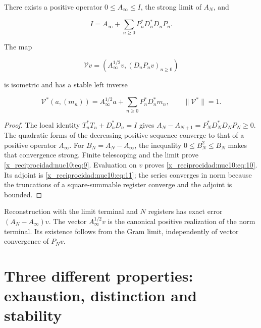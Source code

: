 \begin{theorem}
\label{x_reciprocidad:nuclear:terminal-no-estacionario}
There exists a positive operator \(0\leq A_\infty\leq I\), the strong limit of \(A_N\), and



\begin{equation}
\boxed{I=A_\infty+\sum_{n\ge0}P_n^*D_n^*D_nP_n.}
\label{x_reciprocidad:nuc10:eq:9}
\end{equation}



The map



\begin{equation}
\boxed{\mathcal Vv=(A_\infty^{1/2}v,(D_nP_nv)_{n\ge0})}
\label{x_reciprocidad:nuc10:eq:10}
\end{equation}



is isometric and has a stable left inverse



\begin{equation}
\mathcal V^*(a,(m_n))=A_\infty^{1/2}a+
\sum_{n\ge0}P_n^*D_n^*m_n,\qquad\|\mathcal V^*\|=1.
\label{x_reciprocidad:nuc10:eq:11}
\end{equation}



\end{theorem}
\begin{proof}
The local identity \(T_n^*T_n+D_n^*D_n=I\) gives
\(A_N-A_{N+1}=P_N^*D_N^*D_NP_N\geq0\). The quadratic forms of
the decreasing positive sequence converge to that of a positive operator
\(A_\infty\). For \(B_N=A_N-A_\infty\), the inequality
\(0\leq B_N^2\leq B_N\) makes that convergence strong.
Finite telescoping and the limit prove \eqref{x_reciprocidad:nuc10:eq:9}. Evaluation on \(v\)
proves \eqref{x_reciprocidad:nuc10:eq:10}. Its adjoint is \eqref{x_reciprocidad:nuc10:eq:11}; the series converges in norm because
the truncations of a square-summable register converge and the adjoint is bounded.
\end{proof}

Reconstruction with the limit terminal and \(N\) registers has exact
error \((A_N-A_\infty)v\). The vector \(A_\infty^{1/2}v\) is the
canonical positive realization of the norm terminal. Its existence follows
from the Gram limit, independently of vector convergence of \(P_Nv\).

\section{Three different properties: exhaustion, distinction and stability}

